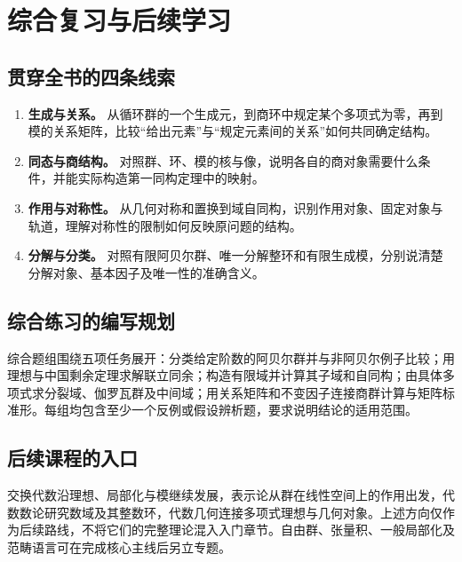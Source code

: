 \chapter{综合复习与后续学习}

\section{贯穿全书的四条线索}
\begin{enumerate}
  \item \textbf{生成与关系。} 从循环群的一个生成元，到商环中规定某个多项式为零，再到模的关系矩阵，比较“给出元素”与“规定元素间的关系”如何共同确定结构。
  \item \textbf{同态与商结构。} 对照群、环、模的核与像，说明各自的商对象需要什么条件，并能实际构造第一同构定理中的映射。
  \item \textbf{作用与对称性。} 从几何对称和置换到域自同构，识别作用对象、固定对象与轨道，理解对称性的限制如何反映原问题的结构。
  \item \textbf{分解与分类。} 对照有限阿贝尔群、唯一分解整环和有限生成模，分别说清楚分解对象、基本因子及唯一性的准确含义。
\end{enumerate}

\section{综合练习的编写规划}
综合题组围绕五项任务展开：分类给定阶数的阿贝尔群并与非阿贝尔例子比较；用理想与中国剩余定理求解联立同余；构造有限域并计算其子域和自同构；由具体多项式求分裂域、伽罗瓦群及中间域；用关系矩阵和不变因子连接商群计算与矩阵标准形。每组均包含至少一个反例或假设辨析题，要求说明结论的适用范围。

\section{后续课程的入口}
交换代数沿理想、局部化与模继续发展，表示论从群在线性空间上的作用出发，代数数论研究数域及其整数环，代数几何连接多项式理想与几何对象。上述方向仅作为后续路线，不将它们的完整理论混入入门章节。自由群、张量积、一般局部化及范畴语言可在完成核心主线后另立专题。

